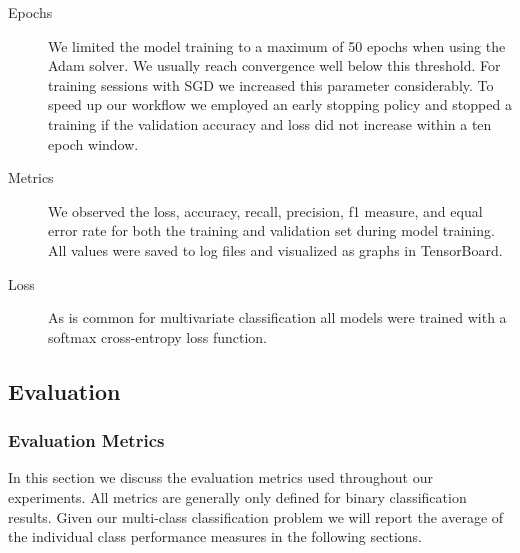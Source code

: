 \begin{description}
	\item[Epochs] We limited the model training to a maximum of 50 epochs when using the Adam solver. We usually reach convergence well below this threshold. For training sessions with SGD we increased this parameter considerably. To speed up our workflow we employed an early stopping policy and stopped a training if the validation accuracy and loss did not increase within a ten epoch window.
	\item[Metrics] We observed the loss, accuracy, recall, precision, f1 measure, and equal error rate for both the training and validation set during model training. All values were saved to log files and visualized as graphs in TensorBoard.  
	\item[Loss] As is common for multivariate classification all models were trained with a softmax cross-entropy loss function.
	\end{description}


\subsection{Evaluation} 

\subsubsection{Evaluation Metrics} 
\label{sec:metrics}
In this section we discuss the evaluation metrics used throughout our experiments. All metrics are generally only defined for binary classification results. Given our multi-class classification problem we will report the average of the individual class performance measures in the following sections. 

